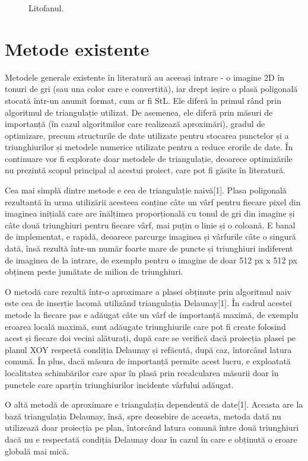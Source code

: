 \documentclass[12pt]{article}
\begin{document}
\begin{figure}[!htb]
\begin{minipage}{0.24\textwidth}
		\caption{Litofanul.}\label{fig:fig11}
	\end{minipage}\hfill
\end{figure}

\section{Metode existente}

Metodele generale existente în literatură au aceeași intrare - o imagine 2D în tonuri de gri (sau una color care e convertită), iar drept ieșire o plasă poligonală stocată într-un anumit format, cum ar fi StL. Ele diferă în primul rând prin algoritmul de triangulație utilizat. De asemenea, ele diferă prin măsuri de importanță (în cazul algoritmilor care realizează aproximări), gradul de optimizare, precum structurile de date utilizate pentru stocarea punctelor și a triunghiurilor și metodele numerice utilizate pentru a reduce erorile de date. În continuare vor fi explorate doar metodele de triangulație, deoarece optimizările nu prezintă scopul principal al acestui proiect, care pot fi găsite în literatură.

Cea mai simplă dintre metode e cea de triangulație naivă[1]. Plasa poligonală rezultantă în urma utilizării acesteea conține câte un vârf pentru fiecare pixel din imaginea inițială care are înălțimea proporțională cu tonul de gri din imagine și câte două triunghiuri pentru fiecare vârf, mai puțin o linie și o coloană. E banal de implementat, e rapidă, deoarece parcurge imaginea și vârfurile câte o singură dată, însă rezultă într-un număr foarte mare de puncte și triunghiuri indiferent de imaginea de la intrare, de exemplu pentru o imagine de doar 512 px x 512 px obținem peste jumătate de milion de triunghiuri.

O metodă care rezultă într-o aproximare a plasei obținute prin algoritmul naiv este cea de inserție lacomă utilizând triangulația Delaunay[1]. În cadrul acestei metode la fiecare pas e adăugat câte un vârf de importanță maximă, de exemplu eroarea locală maximă, sunt adăugate triunghiurile care pot fi create folosind acest și fiecare doi vecini alăturați, după care se verifică dacă proiecția plasei pe planul XOY respectă condiția Delaunay și refăcută, după caz, întorcând latura comună. În plus, dacă măsura de importanță permite acest lucru, e exploatată localitatea schimbărilor care apar în plasă prin recalcularea măsurii doar în punctele care aparțin triunghiurilor incidente vârfului adăugat.

O altă metodă de aproximare e triangulația dependentă de date[1]. Aceasta are la bază triangulația Delaunay, însă, spre deosebire de aceasta, metoda dată nu utilizează doar proiecția pe plan, întorcând latura comună între două triunghiuri dacă nu e respectată condiția Delaunay doar în cazul în care e obținută o eroare globală mai mică.
\end{document}
